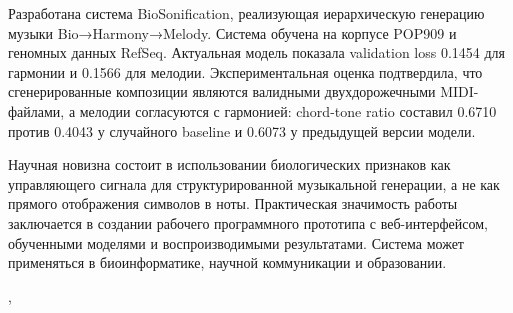 \begin{par}
Разработана система BioSonification, реализующая иерархическую генерацию музыки Bio→Harmony→Melody. Система обучена на корпусе POP909 и геномных данных RefSeq. Актуальная модель показала validation loss 0.1454 для гармонии и 0.1566 для мелодии. Экспериментальная оценка подтвердила, что сгенерированные композиции являются валидными двухдорожечными MIDI-файлами, а мелодии согласуются с гармонией: chord-tone ratio составил 0.6710 против 0.4043 у случайного baseline и 0.6073 у предыдущей версии модели.

Научная новизна состоит в использовании биологических признаков как управляющего сигнала для структурированной музыкальной генерации, а не как прямого отображения символов в ноты. Практическая значимость работы заключается в создании рабочего программного прототипа с веб-интерфейсом, обученными моделями и воспроизводимыми результатами. Система может применяться в биоинформатике, научной коммуникации и образовании.

\begin{flushleft}
    \vspace{1.02cm}
    \vfill
    \student, \\
    \readydate\space\currentyear
\end{flushleft}

\end{par}
